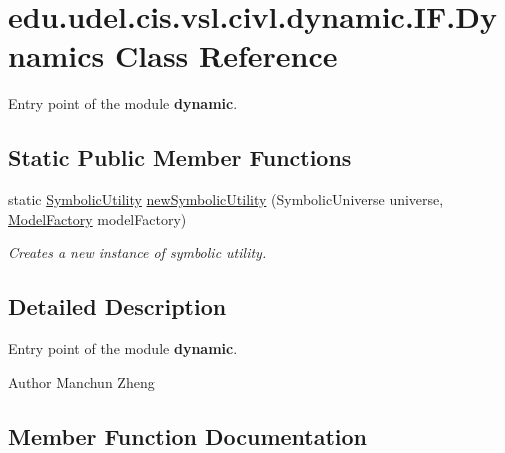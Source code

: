 \hypertarget{classedu_1_1udel_1_1cis_1_1vsl_1_1civl_1_1dynamic_1_1IF_1_1Dynamics}{}\section{edu.\+udel.\+cis.\+vsl.\+civl.\+dynamic.\+I\+F.\+Dynamics Class Reference}
\label{classedu_1_1udel_1_1cis_1_1vsl_1_1civl_1_1dynamic_1_1IF_1_1Dynamics}


Entry point of the module {\bfseries dynamic}.  


\subsection*{Static Public Member Functions}
\begin{DoxyCompactItemize}
\item 
static \hyperlink{interfaceedu_1_1udel_1_1cis_1_1vsl_1_1civl_1_1dynamic_1_1IF_1_1SymbolicUtility}{Symbolic\+Utility} \hyperlink{classedu_1_1udel_1_1cis_1_1vsl_1_1civl_1_1dynamic_1_1IF_1_1Dynamics_abcd28e124894f6079b43944ed9831abb}{new\+Symbolic\+Utility} (Symbolic\+Universe universe, \hyperlink{interfaceedu_1_1udel_1_1cis_1_1vsl_1_1civl_1_1model_1_1IF_1_1ModelFactory}{Model\+Factory} model\+Factory)
\begin{DoxyCompactList}\small\item\em Creates a new instance of symbolic utility. \end{DoxyCompactList}\end{DoxyCompactItemize}


\subsection{Detailed Description}
Entry point of the module {\bfseries dynamic}. 

\begin{DoxyAuthor}{Author}
Manchun Zheng 
\end{DoxyAuthor}


\subsection{Member Function Documentation}
\hypertarget{classedu_1_1udel_1_1cis_1_1vsl_1_1civl_1_1dynamic_1_1IF_1_1Dynamics_abcd28e124894f6079b43944ed9831abb}{}
